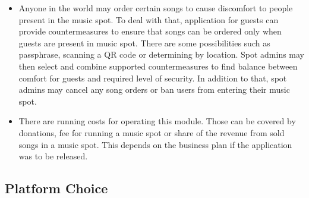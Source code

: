 \begin{itemize}
    \item Anyone in the world may order certain songs to cause discomfort to people present in the music spot. To deal with that, application for guests can provide countermeasures to ensure that songs can be ordered only when guests are present in music spot. There are some possibilities such as passphrase, scanning a QR code or determining by location. Spot admins may then select and combine supported countermeasures to find balance between comfort for guests and required level of security. In addition to that, spot admins may cancel any song orders or ban users from entering their music spot.
    \item There are running costs for operating this module. Those can be covered by donations, fee for running a music spot or share of the revenue from sold songs in a music spot. This depends on the business plan if the application was to be released.
\end{itemize}

\subsection{Platform Choice}


